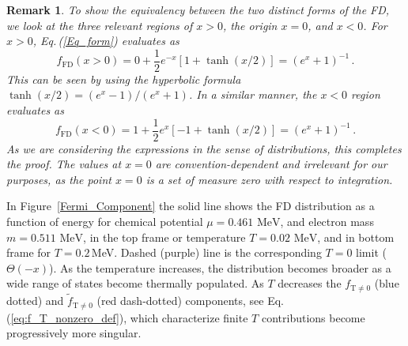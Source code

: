 \documentclass[sn-mathphys,Numbered]{sn-jnl}
\newcommand{\req}[1]{Eq.\,(\ref{#1})}
\newcommand{\rf}[1]{Figure~{\ref{#1}}}
\newcommand*{\MeV}{\text{ MeV}}
\newtheorem{remark}{Remark}
\begin{document}
\begin{remark}\label{remark:TFdist}
To show the equivalency between the two distinct forms of the FD, we look at the three relevant regions of $x>0$, the origin $x=0$, and $x<0$. For $x>0$, \req{Eq_form} evaluates as
\begin{equation}\label{eq:xpos}
 f_\mathrm{FD}(x>0) = 0 + \frac{1}{2}e^{-x}[1+\tanh(x/2)] = (e^x + 1)^{-1}\,.
 \end{equation}
 This can be seen by using the hyperbolic formula $\tanh(x/2)=(e^x-1)/(e^x+1)$. In a similar manner, the $x<0$ region evaluates as
 \begin{equation}\label{eq:xneg}
 f_\mathrm{FD}(x<0) = 1 + \frac{1}{2}e^{x}[-1 + \tanh(x/2)] = (e^x + 1)^{-1}\,.
 \end{equation}
 As we are considering the expressions in the sense of distributions, this completes the proof. The values at $x=0$ are convention-dependent and irrelevant for our purposes, as the point $x=0$ is a set of measure zero with respect to integration.
\end{remark} 


In \rf{Fermi_Component}  the solid line shows the FD distribution as a function of energy for chemical potential $\mu=0.461\MeV$, and electron mass $m=0.511\MeV$, in the top frame or temperature $T=0.02\MeV$, and in bottom frame for $T=0.2$\,MeV. Dashed (purple) line is the corresponding $T=0$ limit ($\Theta(-x)$). As the temperature increases, the distribution becomes broader as a wide range of states become thermally populated. As $T$ decreases the $f_\mathrm{T\neq0}$ (blue dotted) and $\widetilde f_\mathrm{T\neq0}$ (red dash-dotted) components, see \req{eq:f_T_nonzero_def}, which characterize finite $T$ contributions become progressively more singular.
 
\end{document}
